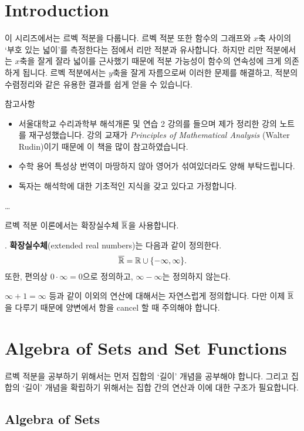 \section*{Introduction}

이 시리즈에서는 르벡 적분을 다룹니다. 르벡 적분 또한 함수의 그래프와 \(x\)축 사이의 `부호 있는 넓이'를 측정한다는 점에서 리만 적분과 유사합니다. 하지만 리만 적분에서는 \(x\)축을 잘게 잘라 넓이를 근사했기 때문에 적분 가능성이 함수의 연속성에 크게 의존하게 됩니다. 르벡 적분에서는 \(y\)축을 잘게 자름으로써 이러한 문제를 해결하고, 적분의 수렴정리와 같은 유용한 결과를 쉽게 얻을 수 있습니다.

참고사항
\begin{itemize}
    \item 서울대학교 수리과학부 해석개론 및 연습 2 강의를 들으며 제가 정리한 강의 노트를 재구성했습니다. 강의 교재가 \textit{Principles of Mathematical Analysis} (Walter Rudin)이기 때문에 이 책을 많이 참고하였습니다.
    \item 수학 용어 특성상 번역이 마땅하지 않아 영어가 섞여있더라도 양해 부탁드립니다.
    \item 독자는 해석학에 대한 기초적인 지식을 갖고 있다고 가정합니다.
\end{itemize}

\dots

르벡 적분 이론에서는 확장실수체 \(\overline{\R}\)을 사용합니다.

. \note{\(\overline{\R}\)} \textbf{확장실수체}(extended real numbers)는 다음과 같이 정의한다.
\[
    \overline{\mathbb{R}} = \mathbb{R} \cup \{-\infty, \infty\}.
\]
또한, 편의상 \(0\cdot \infty = 0\)으로 정의하고, \(\infty - \infty\)는 정의하지 않는다.

\(\infty + 1 = \infty\) 등과 같이 이외의 연산에 대해서는 자연스럽게 정의합니다. 다만 이제 \(\overline{\R}\)을 다루기 때문에 양변에서 항을 cancel 할 때 주의해야 합니다.

\section*{Algebra of Sets and Set Functions}

르벡 적분을 공부하기 위해서는 먼저 집합의 `길이' 개념을 공부해야 합니다. 그리고 집합의 `길이' 개념을 확립하기 위해서는 집합 간의 연산과 이에 대한 구조가 필요합니다.

\subsection*{Algebra of Sets}

